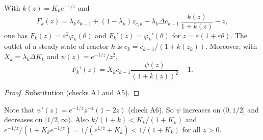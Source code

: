 \documentclass[11pt,a4paper]{report}
\newcommand*{\eps}{\varepsilon}
\begin{document}
\begin{lemma}[note={reduced variables}]\label{lem:zform}
With \(k(z)=K_ke^{-1/z}\) and
\[
F_k(z)=\lambda_kz_{k-1}+(1-\lambda_k)z_{c,k}+\lambda_k\Delta c_{k-1}\,\frac{k(z)}{1+k(z)}-z ,
\]
one has \(F_k(z)=\eps^2\varphi_k(\theta)\) and \(F_k'(z)=\varphi_k'(\theta)\) for \(z=\eps(1+\eps\theta)\). The outlet
of a steady state of reactor \(k\) is \(c_k=c_{k-1}/(1+k(z_k))\). Moreover, with \(X_k=\lambda_k\Delta K_k\) and
\(\psi(z)=e^{-1/z}/z^2\),
\[
F_k'(z)=X_kc_{k-1}\frac{\psi(z)}{(1+k(z))^2}-1 .
\]
\end{lemma}
\begin{proof}
Substitution (checks A1 and A5).
\end{proof}

Note that \(\psi'(z)=e^{-1/z}z^{-4}(1-2z)\) (check A6). So \(\psi\) increases on \((0,1/2]\) and decreases on
\([1/2,\infty)\). Also \(k/(1+k)<K_k/(1+K_k)\) and \(e^{-1/z}/(1+K_ke^{-1/z})=1/(e^{1/z}+K_k)<1/(1+K_k)\) for all
\(z>0\).
\end{document}
